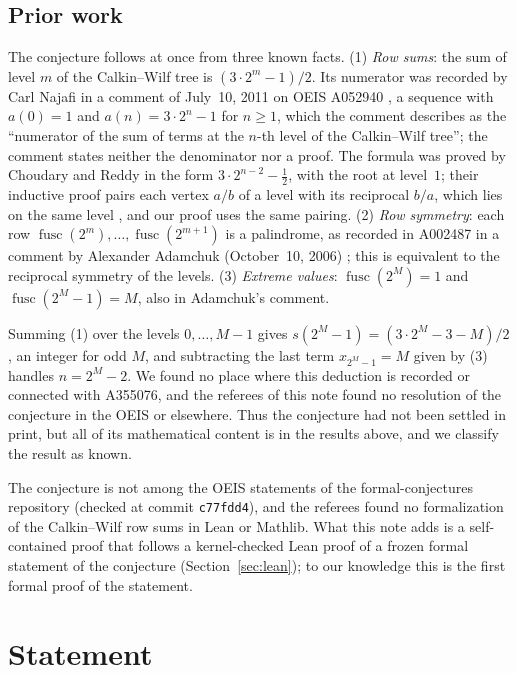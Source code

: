 \documentclass[11pt]{amsart}
\theoremstyle{plain}
\theoremstyle{definition}
\DeclareMathOperator{\fusc}{fusc}
\begin{document}
\subsection*{Prior work}
The conjecture follows at once from three known facts. (1) \emph{Row sums}: the sum of level $m$ of the Calkin--Wilf tree is $(3\cdot2^m-1)/2$. Its numerator was recorded by Carl Najafi in a comment of July~10, 2011 on OEIS A052940 \cite{A052940}, a sequence with $a(0)=1$ and $a(n)=3\cdot2^n-1$ for $n\ge1$, which the comment describes as the ``numerator of the sum of terms at the $n$-th level of the Calkin--Wilf tree''; the comment states neither the denominator nor a proof. The formula was proved by Choudary and Reddy \cite[Theorem~1.1, Part~11]{CR} in the form $3\cdot2^{n-2}-\frac12$, with the root at level~$1$; their inductive proof pairs each vertex $a/b$ of a level with its reciprocal $b/a$, which lies on the same level \cite[Theorem~1.1, Part~4]{CR}, and our proof uses the same pairing. (2) \emph{Row symmetry}: each row $\fusc(2^m),\dots,\fusc(2^{m+1})$ is a palindrome, as recorded in A002487 in a comment by Alexander Adamchuk (October~10, 2006) \cite{A002487}; this is equivalent to the reciprocal symmetry of the levels. (3) \emph{Extreme values}: $\fusc(2^M)=1$ and $\fusc(2^M-1)=M$, also in Adamchuk's comment.

Summing (1) over the levels $0,\dots,M-1$ gives $s(2^M-1)=(3\cdot2^M-3-M)/2$, an integer for odd $M$, and subtracting the last term $x_{2^M-1}=M$ given by (3) handles $n=2^M-2$. We found no place where this deduction is recorded or connected with A355076, and the referees of this note found no resolution of the conjecture in the OEIS or elsewhere. Thus the conjecture had not been settled in print, but all of its mathematical content is in the results above, and we classify the result as known.

The conjecture is not among the OEIS statements of the formal-conjectures repository \cite{FC} (checked at commit \texttt{c77fdd4}), and the referees found no formalization of the Calkin--Wilf row sums in Lean or Mathlib. What this note adds is a self-contained proof that follows a kernel-checked Lean proof of a frozen formal statement of the conjecture (Section~\ref{sec:lean}); to our knowledge this is the first formal proof of the statement.

\section{Statement}\label{sec:statement}
\end{document}
